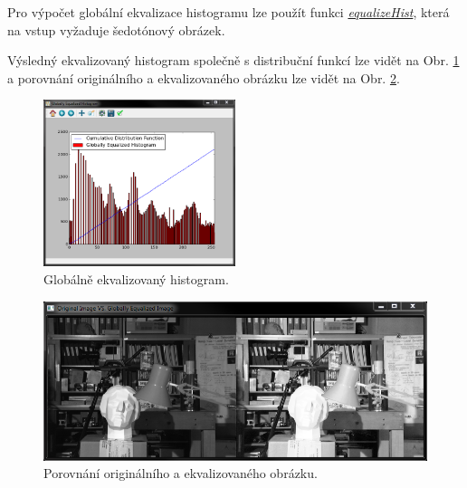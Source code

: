 \documentclass[12pt, a4paper]{article}
\begin{document}
\par{Pro výpočet globální ekvalizace histogramu lze použít funkci \href{http://docs.opencv.org/modules/imgproc/doc/histograms.html?highlight=equalizehist#cv2.equalizeHist}{\textit{equalizeHist}}, která na vstup vyžaduje šedotónový obrázek.

Výsledný ekvalizovaný histogram společně s distribuční funkcí lze vidět na Obr. \ref{fig:GSEQ_histogram} a porovnání originálního a ekvalizovaného obrázku lze vidět na Obr. \ref{fig:GSvsEQ_image}.
\begin{figure}[!ht]
	\centering
	\includegraphics[width=0.5\textwidth]{GSEQ_histogram.png}
	\caption{Globálně ekvalizovaný histogram.}	
	\label{fig:GSEQ_histogram}
\end{figure}
\begin{figure}[!ht]
	\centering
	\includegraphics[width=1\textwidth]{GSvsEQ_image.png}
	\caption{Porovnání originálního a ekvalizovaného obrázku.}	
	\label{fig:GSvsEQ_image}
\end{figure}}










\newpage
\end{document}
